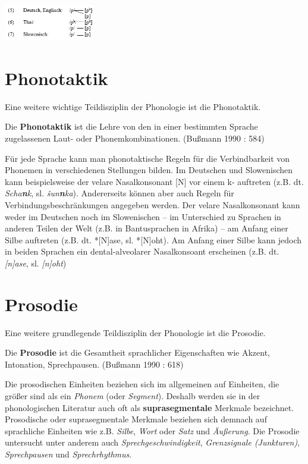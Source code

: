 \documentclass[
  letterpaper,
]{scrbook}
\begin{document}
\includegraphics[width=0.3\textwidth,height=\textheight]{./pictures/01b_NSG_Intro_2020-10-07/phoneme_und_allophone2.png}

\hypertarget{phonotaktik}{%
\section{Phonotaktik}\label{phonotaktik}}

Eine weitere wichtige Teildisziplin der Phonologie ist die Phonotaktik.

Die \textbf{Phonotaktik} ist die Lehre von den in einer bestimmten
Sprache zugelassenen Laut- oder Phonemkombinationen. (Bußmann 1990 :
584)

Für jede Sprache kann man phonotaktische Regeln für die Verbindbarkeit
von Phonemen in verschiedenen Stellungen bilden. Im Deutschen und
Slowenischen kann beispielsweise der velare Nasalkonsonant {[}N{]} vor
einem k- auftreten (z.B. dt. \emph{Scha\textbf{n}k}, sl.
\emph{šun\textbf{n}ka}). Andererseits können aber auch Regeln für
Verbindungsbeschränkungen angegeben werden. Der velare Nasalkonsonant
kann weder im Deutschen noch im Slowenischen -- im Unterschied zu
Sprachen in anderen Teilen der Welt (z.B. in Bantusprachen in Afrika) --
am Anfang einer Silbe auftreten (z.B. dt. *{[}N{]}ase, sl. *{[}N{]}oht).
Am Anfang einer Silbe kann jedoch in beiden Sprachen ein
dental-alveolarer Nasalkonsoant erscheinen (z.B. dt. \emph{{[}n{]}ase},
sl. \emph{{[}n{]}oht})

\hypertarget{prosodie}{%
\section{Prosodie}\label{prosodie}}

Eine weitere grundlegende Teildisziplin der Phonologie ist die Prosodie.

Die \textbf{Prosodie} ist die Gesamtheit sprachlicher Eigenschaften wie
Akzent, Intonation, Sprechpausen. (Bußmann 1990 : 618)

Die prosodischen Einheiten beziehen sich im allgemeinen auf Einheiten,
die größer sind als ein \emph{Phonem} (oder \emph{Segment}). Deshalb
werden sie in der phonologischen Literatur auch oft als
\textbf{suprasegmentale} Merkmale bezeichnet. Prosodische oder
suprasegmentale Merkmale beziehen sich demnach auf sprachliche Einheiten
wie z.B. \emph{Silbe}, \emph{Wort} oder \emph{Satz} und \emph{Äußerung}.
Die Prosodie untersucht unter anderem auch \emph{Sprechgeschwindigkeit},
\emph{Grenzsignale (Junkturen)}, \emph{Sprechpausen} und
\emph{Sprechrhythmus}.
\end{document}
